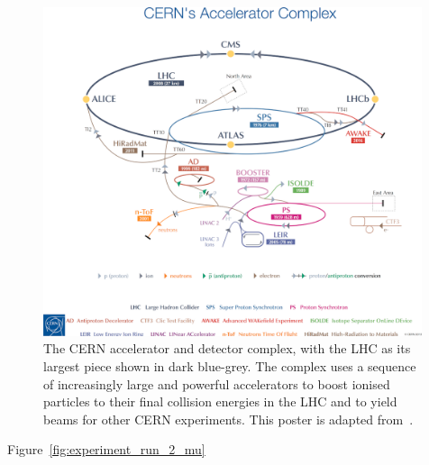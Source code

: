 \begin{figure}[tp]
\centering
\includegraphics[width=0.99\textwidth]{figures/atlas_lhc_complex.png}
\caption[
The CERN accelerator and detector complex, with the LHC as its largest piece
]{%
The CERN accelerator and detector complex, with the LHC as its largest piece
shown in dark blue-grey.
The complex uses a sequence of increasingly large and powerful accelerators to
boost ionised particles to their final collision energies in the LHC and to
yield beams for other CERN experiments.
This poster is adapted from~\cite{Haffner:1621894}.
}
\label{fig:experiment_cern_complex}
\end{figure}

Figure~\ref{fig:experiment_run_2_mu}


